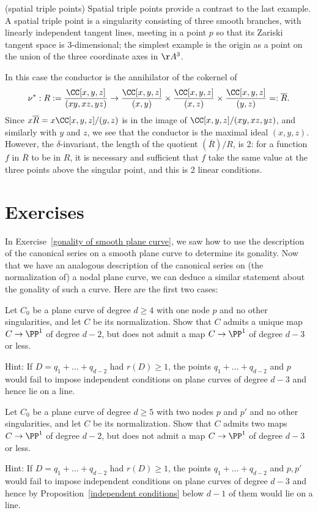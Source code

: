 \begin{example} (spatial triple points) Spatial triple points provide a contrast to the last example. A spatial triple point is a singularity consisting of three smooth branches, with linearly independent tangent lines, meeting in a point $p$ so that its Zariski tangent space is 3-dimensional; the simplest example is the origin as a point on the union of the three coordinate axes in $\AA^3$.

In this case the conductor is the annihilator of the cokernel of
$$
\nu^{*}: R := \frac{\CC[x,y,z]}{(xy, xz, yz)} \to \frac{\CC[x,y,z]}{(x,y)} \times \frac{\CC[x,y,z]}{(x,z)} \times \frac{\CC[x,y,z]}{(y,z)} =: \overline R.
$$
Since $x\overline {R} = x \CC[x,y,z]/(y,z)$ is in the image of $\CC[x,y,z]/(xy, xz, yz)$, and similarly with $y$ and $z$,
we see that the conductor is the maximal ideal $(x,y,z)$. However, the $\delta$-invariant, the length
of the quotient $(\overline R)/R$, is 2: for a function $f$ in $\overline R$ to be in $R$, it
is necessary and sufficient that $f$ take the same value at the three points above the singular point, 
and this is
2 linear conditions.
\end{example}

\section{Exercises}

In Exercise~\ref{gonality of smooth plane curve}, we saw how to use the description of the canonical series on a smooth plane curve to determine its gonality. Now that we have an analogous description of the canonical series on (the normalization of) a nodal plane curve, we can deduce a similar statement about the gonality of such a curve. Here are the first two cases: 

\begin{exercise}
Let $C_0$ be a plane curve of degree $d\geq 4$ with one node $p$ and no other singularities, and let $C$ be its normalization. Show that $C$ admits a unique map $C \to \PP^1$ of degree $d-2$, but does not admit a map $C \to \PP^1$ of degree $d-3$ or less.

Hint: If $D = q_1 + \dots + q_{d-2}$ had $r(D) \geq 1$, the points $q_1 + \dots + q_{d-2}$ and $p$ would fail to impose independent conditions on plane curves of degree $d-3$ and hence lie on a line.
\end{exercise}

\begin{exercise}
Let $C_0$ be a plane curve of degree $d\geq 5$ with two nodes $p$ and $p'$ and no other singularities, and let $C$ be its normalization. Show that $C$ admits two maps $C \to \PP^1$ of degree $d-2$, but does not admit a map $C \to \PP^1$ of degree $d-3$ or less.

Hint: If $D = q_1 + \dots + q_{d-2}$ had $r(D) \geq 1$, the points $q_1 + \dots + q_{d-2}$ and $p, p'$ would fail to impose independent conditions on plane curves of degree $d-3$ and hence by Proposition~\ref{independent conditions} below $d-1$ of them would lie on a line.
\end{exercise}

